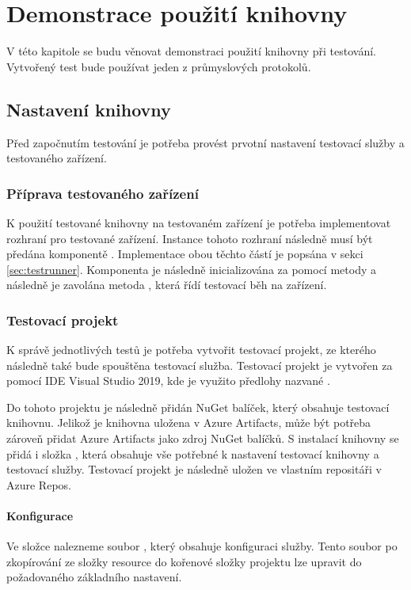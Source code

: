 \chapter{Demonstrace použití knihovny}\label{chap:demonstration}

V této kapitole se budu věnovat demonstraci použití knihovny při testování. Vytvořený test bude používat jeden z průmyslových protokolů.

\section{Nastavení knihovny}
Před započnutím testování je potřeba provést prvotní nastavení testovací služby a testovaného zařízení.

\subsection{Příprava testovaného zařízení}
K použití testované knihovny na testovaném zařízení je potřeba implementovat rozhraní pro testované zařízení. Instance tohoto rozhraní následně musí být předána komponentě . Implementace obou těchto částí je popsána v sekci \ref{sec:testrunner}. Komponenta  je následně inicializována za pomocí metody  a následně je zavolána metoda , která řídí testovací běh na zařízení.
 
\subsection{Testovací projekt}
K správě jednotlivých testů je potřeba vytvořit testovací projekt, ze kterého následně také bude spouštěna testovací služba. Testovací projekt je vytvořen za pomocí IDE Visual Studio 2019, kde je využito předlohy nazvané .

Do tohoto projektu je následně přidán NuGet balíček, který obsahuje testovací knihovnu. Jelikož je knihovna uložena v Azure Artifacts, může být potřeba zároveň přidat Azure Artifacts jako zdroj NuGet balíčků. S instalací knihovny se přidá i složka , která obsahuje vše potřebné k nastavení testovací knihovny a testovací služby. Testovací projekt je následně uložen ve vlastním repositáři v Azure Repos.  

\subsubsection{Konfigurace}
Ve složce  nalezneme soubor , který obsahuje konfiguraci služby. Tento soubor po zkopírování ze složky resource do kořenové složky projektu lze upravit do požadovaného základního nastavení. 

